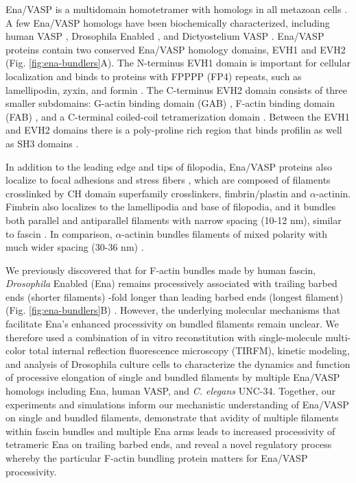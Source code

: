 Ena/VASP is a multidomain homotetramer with homologs in all metazoan cells \citep{sebe-pedros_insights_2013}. A few Ena/VASP homologs have been biochemically characterized, including human VASP \citep{bachmann_evh2_1999, chereau_understanding_2006, breitsprecher_clustering_2008, pasic_ena/vasp_2008, hansen_vasp_2010}, Drosophila Enabled \citep{winkelman_ena/vasp_2014}, and Dictyostelium VASP \citep{breitsprecher_clustering_2008}. Ena/VASP proteins contain two conserved Ena/VASP homology domains, EVH1 and EVH2 (Fig. \ref{fig:ena-bundlers}A). The N-terminus EVH1 domain is important for cellular localization and binds to proteins with FPPPP (FP4) repeats, such as lamellipodin, zyxin, and formin \citep{ball_evh1_2001,bilancia_enabled_2014}. The C-terminus EVH2 domain consists of three smaller subdomains: G-actin binding domain (GAB) \citep{bachmann_evh2_1999,ferron_structural_2007}, F-actin binding domain (FAB) \citep{dominguez_actin_2011}, and a C-terminal coiled-coil tetramerization domain \citep{bachmann_evh2_1999,kuhnel_vasp_2004}. Between the EVH1 and EVH2 domains there is a poly-proline rich region that binds profilin as well as SH3 domains \citep{ferron_structural_2007,hansen_vasp_2010}.

In addition to the leading edge and tips of filopodia, Ena/VASP proteins also localize to focal adhesions and stress fibers \citep{reinhard_46/50_1992,brindle_focal-adhesion_1996}, which are composed of filaments crosslinked by CH domain superfamily crosslinkers, fimbrin/plastin and $\alpha$-actinin. Fimbrin also localizes to the lamellipodia and base of filopodia, and it bundles both parallel and antiparallel filaments with narrow spacing (10-12 nm), similar to fascin \citep{hanein_atomic_1998}. In comparison, $\alpha$-actinin bundles filaments of mixed polarity with much wider spacing (30-36 nm) \citep{sjoblom_alpha-actinin_2008}.

We previously discovered that for F-actin bundles made by human fascin, \textit{Drosophila} Enabled (Ena) remains processively associated with trailing barbed ends (shorter filaments) -fold longer than leading barbed ends (longest filament) (Fig. \ref{fig:ena-bundlers}B) \citep{winkelman_ena/vasp_2014}. However, the underlying molecular mechanisms that facilitate Ena's enhanced processivity on bundled filaments remain unclear. We therefore used a combination of in vitro reconstitution with single-molecule multi-color total internal reflection fluorescence microscopy (TIRFM), kinetic modeling, and analysis of Drosophila culture cells to characterize the dynamics and function of processive elongation of single and bundled filaments by multiple Ena/VASP homologs including Ena, human VASP, and \textit{C. elegans} UNC-34. Together, our experiments and simulations inform our mechanistic understanding of Ena/VASP on single and bundled filaments, demonstrate that avidity of multiple filaments within fascin bundles and multiple Ena arms leads to increased processivity of tetrameric Ena on trailing barbed ends, and reveal a novel regulatory process whereby the particular F-actin bundling protein matters for Ena/VASP processivity.


